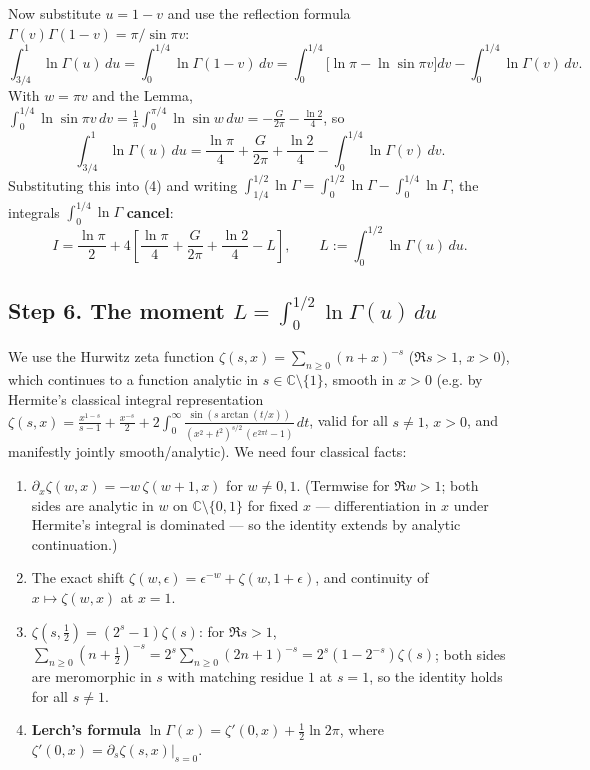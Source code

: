 \documentclass[11pt]{article}
\theoremstyle{remark}
\begin{document}
Now substitute $u=1-v$ and use the reflection formula $\Gamma(v)\Gamma(1-v)=\pi/\sin\pi v$:
$$
\int_{3/4}^{1}\ln\Gamma(u)\,du=\int_0^{1/4}\ln\Gamma(1-v)\,dv
=\int_0^{1/4}\bigl[\ln\pi-\ln\sin\pi v\bigr]dv-\int_0^{1/4}\ln\Gamma(v)\,dv .
$$
With $w=\pi v$ and the Lemma, $\int_0^{1/4}\ln\sin \pi v\,dv=\frac1\pi\int_0^{\pi/4}\ln\sin w\,dw=-\frac{G}{2\pi}-\frac{\ln2}{4}$, so
$$
\int_{3/4}^{1}\ln\Gamma(u)\,du=\frac{\ln\pi}{4}+\frac{G}{2\pi}+\frac{\ln 2}{4}-\int_0^{1/4}\ln\Gamma(v)\,dv .
$$
Substituting this into (4) and writing $\int_{1/4}^{1/2}\ln\Gamma=\int_0^{1/2}\ln\Gamma-\int_0^{1/4}\ln\Gamma$, the integrals $\int_0^{1/4}\ln\Gamma$ \textbf{cancel}:
\begin{equation*}
I=\frac{\ln\pi}{2}+4\left[\frac{\ln\pi}{4}+\frac{G}{2\pi}+\frac{\ln 2}{4}-L\right],
\qquad L:=\int_0^{1/2}\ln\Gamma(u)\,du .
\tag{5}
\end{equation*}

\subsection*{Step 6. The moment $L=\int_0^{1/2}\ln\Gamma(u)\,du$}

We use the Hurwitz zeta function $\zeta(s,x)=\sum_{n\ge0}(n+x)^{-s}$ ($\Re s>1$, $x>0$), which continues to a function analytic in $s\in\mathbb C\setminus\{1\}$, smooth in $x>0$ (e.g. by Hermite's classical integral representation
$\zeta(s,x)=\frac{x^{1-s}}{s-1}+\frac{x^{-s}}{2}+2\int_0^\infty\frac{\sin(s\arctan(t/x))}{(x^{2}+t^{2})^{s/2}\,(e^{2\pi t}-1)}\,dt$,
valid for all $s\ne1$, $x>0$, and manifestly jointly smooth/analytic). We need four classical facts:

\begin{enumerate}
\item $\partial_x\zeta(w,x)=-w\,\zeta(w+1,x)$ for $w\ne 0,1$. (Termwise for $\Re w>1$; both sides are analytic in $w$ on $\mathbb C\setminus\{0,1\}$ for fixed $x$ --- differentiation in $x$ under Hermite's integral is dominated --- so the identity extends by analytic continuation.)
\item The exact shift $\zeta(w,\epsilon)=\epsilon^{-w}+\zeta(w,1+\epsilon)$, and continuity of $x\mapsto\zeta(w,x)$ at $x=1$.
\item $\zeta(s,\tfrac12)=(2^{s}-1)\zeta(s)$: for $\Re s>1$, $\sum_{n\ge0}(n+\tfrac12)^{-s}=2^{s}\sum_{n\ge0}(2n+1)^{-s}=2^{s}(1-2^{-s})\zeta(s)$; both sides are meromorphic in $s$ with matching residue $1$ at $s=1$, so the identity holds for all $s\neq1$.
\item \textbf{Lerch's formula} $\ln\Gamma(x)=\zeta'(0,x)+\frac12\ln 2\pi$, where $\zeta'(0,x)=\partial_s\zeta(s,x)\big|_{s=0}$.
\end{enumerate}
\end{document}
